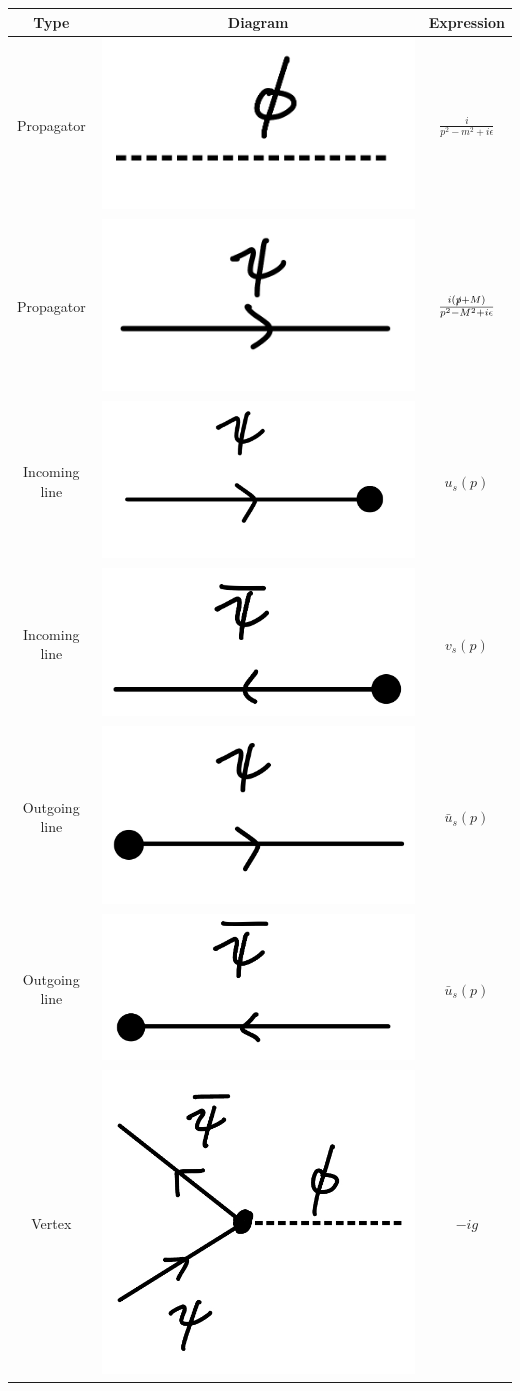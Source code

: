 {\begin{table}[h!tb]
\centering
    \begin{tabular}{|c|c|c|}
    \hline
    Type & Diagram & Expression \\
    \hline
    Propagator & \includegraphics[width=0.2\linewidth]{KG_prop.jpeg} & $\frac{i}{p^2 - m^2 + i \epsilon}$ \\
    \hline
    Propagator & \includegraphics[width=0.2\linewidth]{D_prop.jpeg} & $\frac{i( \slashed{p} + M )}{p^2 - M^2 + i \epsilon}$ \\
    \hline
    Incoming line & \includegraphics[width=0.2\linewidth]{D-part-inc.jpeg} & $u_{s}(p)$ \\
    \hline
    Incoming line & \includegraphics[width=0.2\linewidth]{D-apart-inc.jpeg} & $v_{s}(p)$ \\
    \hline
    Outgoing line & \includegraphics[width=0.2\linewidth]{D-part-out.jpeg} & $\bar{u}_{s}(p)$ \\
    \hline
    Outgoing line & \includegraphics[width=0.2\linewidth]{D-apart-out.jpeg} & $\bar{u}_{s}(p)$ \\
    \hline
    Vertex & \includegraphics[width=0.2\linewidth]{Y_int1.jpeg} & $- i g$ \\

\end{tabular}
\end{table}}
